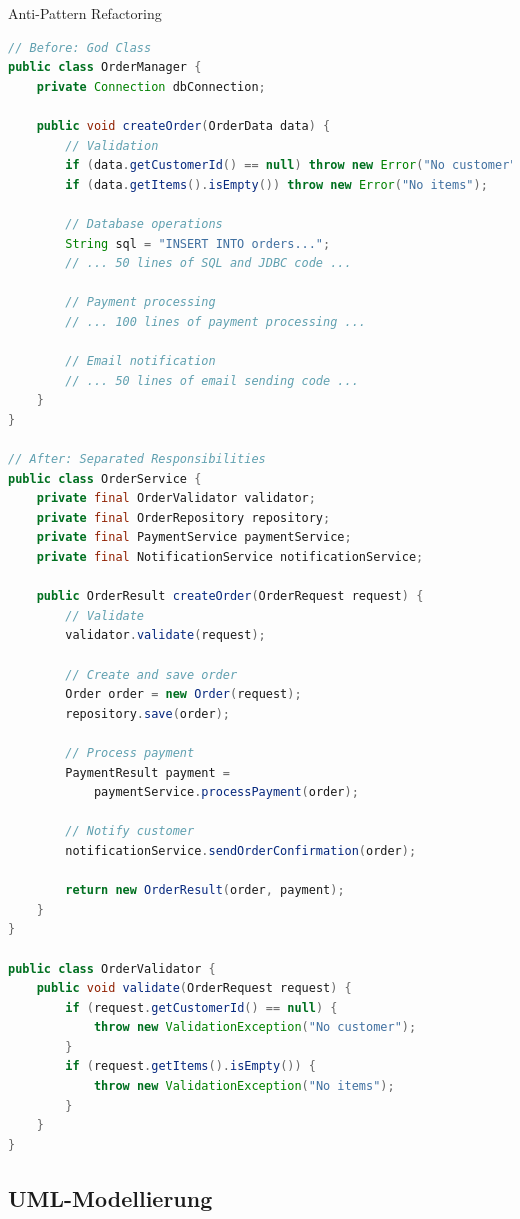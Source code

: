 \begin{example2}{Anti-Pattern Refactoring}
\begin{lstlisting}[language=Java, style=basesmol]
// Before: God Class
public class OrderManager {
    private Connection dbConnection;
    
    public void createOrder(OrderData data) {
        // Validation
        if (data.getCustomerId() == null) throw new Error("No customer");
        if (data.getItems().isEmpty()) throw new Error("No items");
        
        // Database operations
        String sql = "INSERT INTO orders...";
        // ... 50 lines of SQL and JDBC code ...
        
        // Payment processing
        // ... 100 lines of payment processing ...
        
        // Email notification
        // ... 50 lines of email sending code ...
    }
}

// After: Separated Responsibilities
public class OrderService {
    private final OrderValidator validator;
    private final OrderRepository repository;
    private final PaymentService paymentService;
    private final NotificationService notificationService;
    
    public OrderResult createOrder(OrderRequest request) {
        // Validate
        validator.validate(request);
        
        // Create and save order
        Order order = new Order(request);
        repository.save(order);
        
        // Process payment
        PaymentResult payment = 
            paymentService.processPayment(order);
            
        // Notify customer
        notificationService.sendOrderConfirmation(order);
        
        return new OrderResult(order, payment);
    }
}

public class OrderValidator {
    public void validate(OrderRequest request) {
        if (request.getCustomerId() == null) {
            throw new ValidationException("No customer");
        }
        if (request.getItems().isEmpty()) {
            throw new ValidationException("No items");
        }
    }
}
\end{lstlisting}
\end{example2}

\pagebreak

\subsection{UML-Modellierung}

